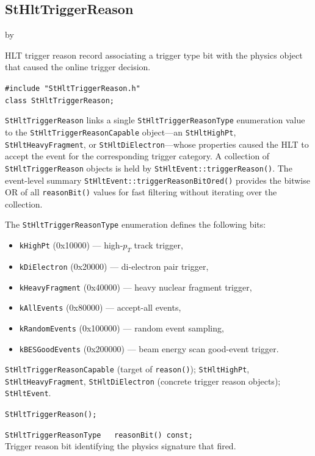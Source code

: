 \documentclass[twoside]{article}
\newcommand{\entrylabel}[1]{\mbox{\textbf{{#1}}}\hfil}%
\newenvironment{entry}
{\begin{list}{}%
    {\renewcommand{\makelabel}{\entrylabel}%
     \setlength{\labelwidth}{90pt}%
     \setlength{\leftmargin}{\labelwidth}
     \advance\leftmargin by \labelsep%
      }%
    }%
  {\end{list}}
\newcommand{\Entrylabel}[1]%
{\raisebox{0pt}[1ex][0pt]{\makebox[\labelwidth][l]%
    {\parbox[t]{\labelwidth}{\hspace{0pt}\textbf{{#1}}}}}}
\newenvironment{Entry}%
{\renewcommand{\entrylabel}{\Entrylabel}\begin{entry}}%
  {\end{entry}}
\begin{document}
\subsection{StHltTriggerReason}
\label{sec:StHltTriggerReason}
\begin{Entry}
\item[Summary] HLT trigger reason record associating a trigger type bit
    with the physics object that caused the online trigger decision.
\item[Synopsis]
    \verb+#include "StHltTriggerReason.h"+\\
    \verb+class StHltTriggerReason;+\\
\item[Description]
    \texttt{StHltTriggerReason} links a single
    \texttt{StHltTriggerReasonType} enumeration value to the
    \texttt{StHltTriggerReasonCapable} object---an
    \texttt{StHltHighPt}, \texttt{StHltHeavyFragment}, or
    \texttt{StHltDiElectron}---whose properties caused the HLT to
    accept the event for the corresponding trigger category.  A
    collection of \texttt{StHltTriggerReason} objects is held by
    \texttt{StHltEvent::triggerReason()}.  The event-level summary
    \texttt{StHltEvent::triggerReasonBitOred()} provides the bitwise OR
    of all \texttt{reasonBit()} values for fast filtering without
    iterating over the collection.

    The \texttt{StHltTriggerReasonType} enumeration defines the
    following bits:
    \begin{itemize}
      \item \texttt{kHighPt}        (0x10000) --- high-$p_T$ track trigger,
      \item \texttt{kDiElectron}    (0x20000) --- di-electron pair trigger,
      \item \texttt{kHeavyFragment} (0x40000) --- heavy nuclear fragment trigger,
      \item \texttt{kAllEvents}     (0x80000) --- accept-all events,
      \item \texttt{kRandomEvents}  (0x100000) --- random event sampling,
      \item \texttt{kBESGoodEvents} (0x200000) --- beam energy scan good-event trigger.
    \end{itemize}
\item[Related Classes]
    \texttt{StHltTriggerReasonCapable} (target of \texttt{reason()});
    \texttt{StHltHighPt}, \texttt{StHltHeavyFragment},
    \texttt{StHltDiElectron} (concrete trigger reason objects);
    \texttt{StHltEvent}.
\item[Public\\ Constructors]
    \verb+StHltTriggerReason();+\\
\item[Public Member\\ Functions]
    \verb+StHltTriggerReasonType   reasonBit() const;+\\
    Trigger reason bit identifying the physics signature that fired.


\end{Entry}
\end{document}
